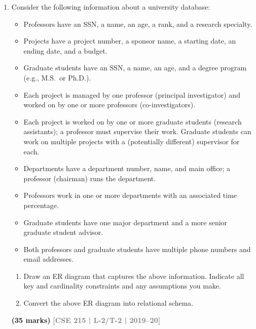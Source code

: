 \documentclass[12pt]{article}
\newcommand{\yr}[1]{\hfill\textcolor{gray}{\small\textbf{[#1]}}}
\newcommand{\mk}[1]{\textcolor{orange!70!black}{\small\textbf{(#1 marks)}}}
\begin{document}
\begin{enumerate}
\begin{center}
\end{center}

\mk{5} \yr{CSE 215 | L-2/T-2 | 2020--21}


\item Consider the following information about a university database:
\begin{itemize}[leftmargin=1.5em,itemsep=1pt]
  \item Professors have an SSN, a name, an age, a rank, and a research specialty.
  \item Projects have a project number, a sponsor name, a starting date, an ending date, and a budget.
  \item Graduate students have an SSN, a name, an age, and a degree program (e.g., M.S.\ or Ph.D.).
  \item Each project is managed by one professor (principal investigator) and worked on by one or more professors (co-investigators).
  \item Each project is worked on by one or more graduate students (research assistants); a professor must supervise their work. Graduate students can work on multiple projects with a (potentially different) supervisor for each.
  \item Departments have a department number, name, and main office; a professor (chairman) runs the department.
  \item Professors work in one or more departments with an associated time percentage.
  \item Graduate students have one major department and a more senior graduate student advisor.
  \item Both professors and graduate students have multiple phone numbers and email addresses.
\end{itemize}
\begin{enumerate}
  \item Draw an ER diagram that captures the above information. Indicate all key and cardinality constraints and any assumptions you make.
  \item Convert the above ER diagram into relational schema.
\end{enumerate}
\mk{35} \yr{CSE 215 | L-2/T-2 | 2019--20}



\end{enumerate}
\end{document}
